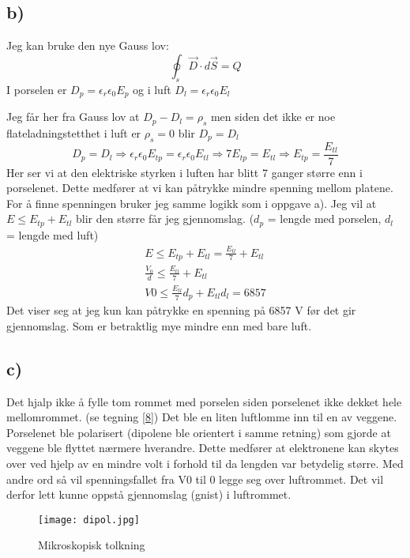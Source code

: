 \documentclass[a4paper,12pt,norsk]{article}
\begin{document}
\subsection{b)}
Jeg kan bruke den nye Gauss lov:
$$\oint_s \vec{D} \cdot d\vec{S} = Q$$
I porselen er $D_p = \epsilon_r\epsilon_0E_p$ og i luft 
$D_l = \epsilon_r\epsilon_0E_l$ 

Jeg får her fra Gauss lov at $D_p - D_l = \rho_s$ men siden det ikke er noe flateladningstetthet i luft er $\rho_s= 0$ blir $D_p = D_l$
$$D_p = D_l \Rightarrow  \epsilon_r\epsilon_0E_{tp}=\epsilon_r\epsilon_0E_{tl} \Rightarrow 7E_{tp}=E_{tl} \Rightarrow E_{tp} = \frac{E_{tl}}{7}$$
Her ser vi at den elektriske styrken i luften har blitt 7 ganger større enn i porselenet. Dette medfører at vi kan påtrykke mindre spenning mellom platene. 
For å finne spenningen bruker jeg samme logikk som i oppgave a). Jeg vil at $E \leq E_{tp} + E_{tl}$ blir den større får jeg gjennomslag. ($d_p$ = lengde med porselen, $d_l$ = lengde med luft)
\begin{align*}
E\leq E_{tp} + E_{tl} = \frac{E_{tl}}{7} + E_{tl}  \\
\frac{V_0}{d} \leq \frac{E_{tl}}{7} + E_{tl} \\
V0 \leq \frac{E_{tl}}{7}d_p + E_{tl}d_l = 6857
\end{align*}
Det viser seg at jeg kun kan påtrykke en spenning på 6857 V før det gir gjennomslag. Som er betraktlig mye mindre enn med bare luft.

\subsection{c)}
Det hjalp ikke å fylle tom rommet med porselen siden porselenet ikke dekket hele mellomrommet. (se tegning \vref{8}) Det ble en liten luftlomme inn til en av veggene. Porselenet ble polarisert (dipolene ble orientert i samme retning) som gjorde at veggene ble flyttet nærmere hverandre. Dette medfører at elektronene kan skytes over ved hjelp av en mindre volt i forhold til da lengden var betydelig større. 
Med andre ord så vil spenningsfallet fra V0 til 0 legge seg over luftrommet. Det vil derfor lett kunne oppstå gjennomslag (gnist) i luftrommet. 

\begin{figure}[h!]
\texttt{[image: dipol.jpg]} 
\caption{Mikroskopisk tolkning}
\label{8}
\end{figure}
\end{document}
